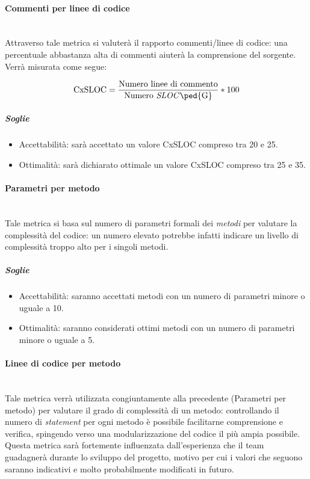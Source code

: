 \paragraph{Commenti per linee di codice}
	~\\Attraverso tale metrica si valuterà il rapporto commenti/linee di codice: una percentuale abbastanza alta di commenti aiuterà la comprensione del sorgente. Verrà misurata come segue:

	\begin{displaymath}
		\mbox{CxSLOC} =\frac{\mbox{Numero linee di commento}}{\mbox{Numero \emph{SLOC}\ped{G}}} * 100
	\end{displaymath}

\subparagraph{Soglie}
	\begin{itemize}
	\item Accettabilità: sarà accettato un valore CxSLOC compreso tra 20 e 25.
	\item Ottimalità: sarà dichiarato ottimale un valore CxSLOC compreso tra 25 e 35.
	\end{itemize}

\paragraph{Parametri per metodo}
	~\\Tale metrica si basa sul numero di parametri formali dei \emph{metodi} per valutare la complessità del codice: un numero elevato potrebbe infatti indicare un livello di complessità troppo alto per i singoli metodi.

\subparagraph{Soglie}
	\begin{itemize}
	\item Accettabilità: saranno accettati metodi con un numero di parametri minore o uguale a 10.
	\item Ottimalità: saranno considerati ottimi metodi con un numero di parametri minore o uguale a 5.
	\end{itemize}

\paragraph{Linee di codice per metodo}
	~\\Tale metrica verrà utilizzata congiuntamente alla precedente (Parametri per metodo) per valutare il grado di complessità di un metodo: controllando il numero di \emph{statement} per ogni metodo è possibile facilitarne comprensione e verifica, spingendo verso una modularizzazione del codice il più ampia possibile. 
Questa metrica sarà fortemente influenzata dall'esperienza che il team guadagnerà durante lo sviluppo del progetto, motivo per cui i valori che seguono saranno indicativi e molto probabilmente modificati in futuro.

